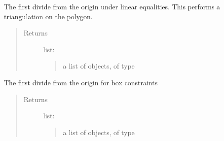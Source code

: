 \documentclass[letterpaper,10pt,english]{sphinxmanual}
\begin{document}
\begin{fulllineitems}
\begin{fulllineitems}
The first divide from the origin under linear equalities.  This performs
a triangulation on the polygon.
\begin{quote}\begin{description}
\item[{Returns}] \leavevmode
list:
\begin{quote}

a list of objects, of type 
\end{quote}

\end{description}\end{quote}

\end{fulllineitems}



\begin{fulllineitems}
The first divide from the origin for box constraints
\begin{quote}\begin{description}
\item[{Returns}] \leavevmode
list:
\begin{quote}

a list of objects, of type 
\end{quote}

\end{description}\end{quote}

\end{fulllineitems}


\end{fulllineitems}
\end{document}
